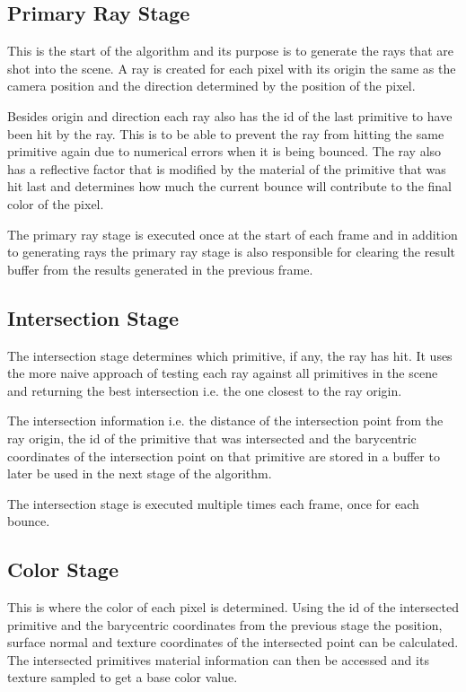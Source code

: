 \documentclass{article}
\begin{document}
\subsection{Primary Ray Stage}
This is the start of the algorithm and its purpose is to generate the rays that are shot into the scene. A ray is created
for each pixel with its origin the same as the camera position and the direction determined by the position of the pixel.

Besides origin and direction each ray also has the id of the last primitive to have been hit by the ray. This is to be able
to prevent the ray from hitting the same primitive again due to numerical errors when it is being bounced. The ray also has
a reflective factor that is modified by the material of the primitive that was hit last and determines how much the current
bounce will contribute to the final color of the pixel. 

The primary ray stage is executed once at the start of each frame and in addition to generating rays the primary ray stage
is also responsible for clearing the result buffer from the results generated in the previous frame.


\subsection{Intersection Stage}
The intersection stage determines which primitive, if any, the ray has hit. It uses the more naive approach of testing each
ray against all primitives in the scene and returning the best intersection i.e. the one closest to the ray origin.

The intersection information i.e. the distance of the intersection point from the ray origin, the id of the primitive that
was intersected and the barycentric coordinates of the intersection point on that primitive are stored in a buffer to
later be used in the next stage of the algorithm.

The intersection stage is executed multiple times each frame, once for each bounce.


\subsection{Color Stage}
This is where the color of each pixel is determined. Using the id of the intersected primitive and the barycentric coordinates
from the previous stage the position, surface normal and texture coordinates of the intersected point can be calculated. The intersected
primitives material information can then be accessed and its texture sampled to get a base color value.
\end{document}
